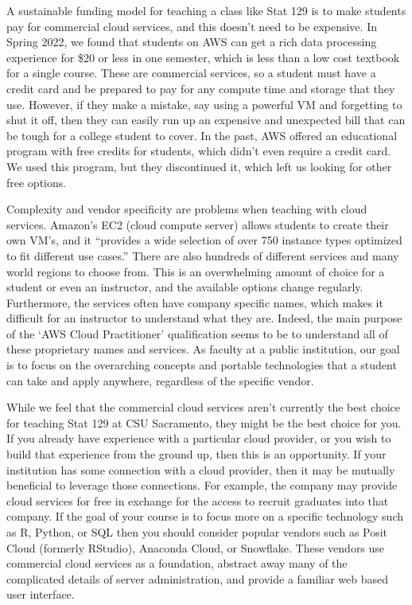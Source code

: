 \documentclass[12pt]{article}
\begin{document}
A sustainable funding model for teaching a class like Stat 129 is to make students pay for commercial cloud services, and this doesn't need to be expensive.
In Spring 2022, we found that students on AWS can get a rich data processing experience for \$20 or less in one semester, which is less than a low cost textbook for a single course.
These are commercial services, so a student must have a credit card and be prepared to pay for any compute time and storage that they use.
However, if they make a mistake, say using a powerful VM and forgetting to shut it off, then they can easily run up an expensive and unexpected bill that can be tough for a college student to cover.
In the past, AWS offered an educational program with free credits for students, which didn't even require a credit card.
We used this program, but they discontinued it, which left us looking for other free options.

Complexity and vendor specificity are problems when teaching with cloud services.
Amazon's EC2 (cloud compute server) allows students to create their own VM's, and it ``provides a wide selection of over 750 instance types optimized to fit different use cases.''\cite{aws-ec2}
There are also hundreds of different services and many world regions to choose from.
This is an overwhelming amount of choice for a student or even an instructor, and the available options change regularly.
Furthermore, the services often have company specific names, which makes it difficult for an instructor to understand what they are.
Indeed, the main purpose of the `AWS Cloud Practitioner' qualification seems to be to understand all of these proprietary names and services.
As faculty at a public institution, our goal is to focus on the overarching concepts and portable technologies that a student can take and apply anywhere, regardless of the specific vendor.

While we feel that the commercial cloud services aren't currently the best choice for teaching Stat 129 at CSU Sacramento, they might be the best choice for you.
If you already have experience with a particular cloud provider, or you wish to build that experience from the ground up, then this is an opportunity. 
If your institution has some connection with a cloud provider, then it may be mutually beneficial to leverage those connections.
For example, the company may provide cloud services for free in exchange for the access to recruit graduates into that company.
If the goal of your course is to focus more on a specific technology such as R, Python, or SQL then you should consider popular vendors such as Posit Cloud (formerly RStudio), Anaconda Cloud, or Snowflake.
These vendors use commercial cloud services as a foundation, abstract away many of the complicated details of server administration, and provide a familiar web based user interface.
\end{document}
